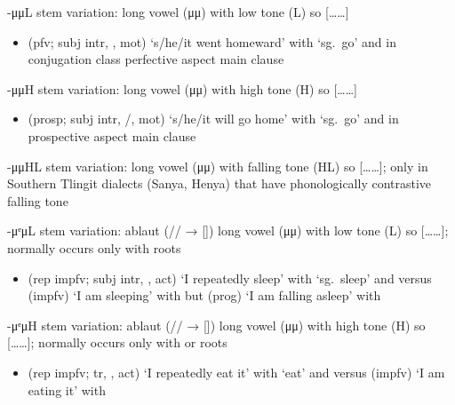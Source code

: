 \begin{morphdesc}[resume*=alphalist]
\item[-μμL]\label{m:-μμL}
	stem variation: long vowel (μμ) with low tone (L) so [……]
	\begin{itemize}
	\item	{} (pfv; subj intr, , mot) ‘s/he/it went homeward’
		with  ‘sg.\ go’ and 
		in  conjugation class perfective aspect main clause
	\end{itemize}

\item[-μμH]\label{m:-μμH}
	stem variation: long vowel (μμ) with high tone (H) so [……]
	\begin{itemize}
	\item	{} (prosp; subj intr, /, mot) ‘s/he/it will go home’
		with  ‘sg.\ go’ and 
		in prospective aspect main clause
	\end{itemize}

\item[-μμHL]\label{m:-μμHL}
	stem variation: long vowel (μμ) with falling tone (HL) so [……];
	only in Southern Tlingit dialects (Sanya, Henya) that have phonologically
		contrastive falling tone

\item[-μᵉμL]\label{m:-μᵉμL}
	stem variation: ablaut (// → []) long vowel (μμ)
		with low tone (L) so [……];
	normally occurs only with  roots
	\begin{itemize}
	\item	{} (rep impfv; subj intr, ,  act) ‘I repeatedly sleep’
			with  ‘sg.\ sleep’ and \newline
		versus
		 (impfv) ‘I am sleeping’
			with \newline
		but  (prog) ‘I am falling asleep’
			with 
	\end{itemize}

\item[-μᵉμH]\label{m:-μᵉμH}
	stem variation: ablaut (// → []) long vowel (μμ)
		with high tone (H) so [……];
	normally occurs only with  or  roots
	\begin{itemize}
	\item	{} (rep impfv; tr, ,  act) ‘I repeatedly eat it’
			with  ‘eat’ and \newline
		versus
		 (impfv) ‘I am eating it’
			with 
	\end{itemize}


\end{morphdesc}
